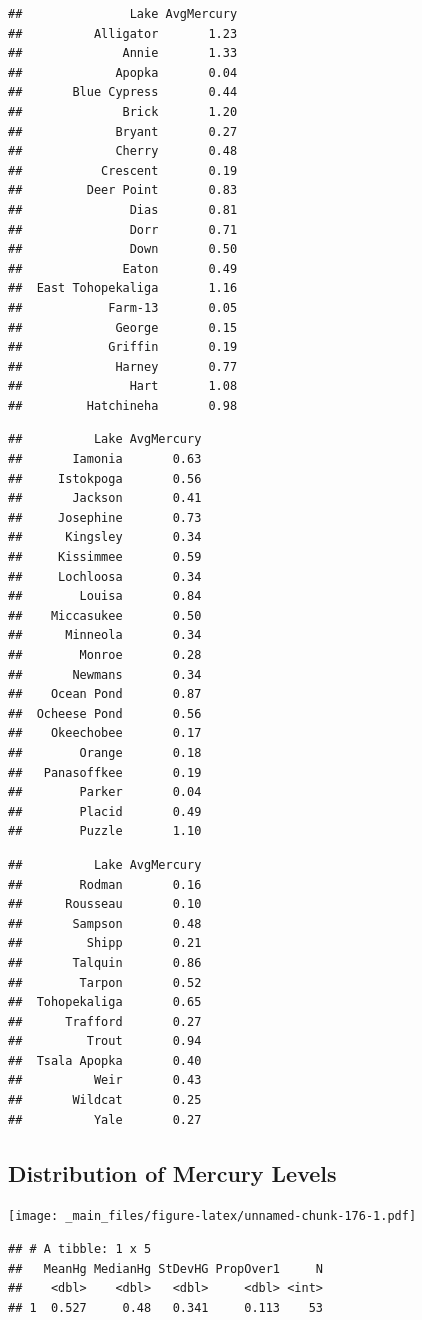 \documentclass[]{book}
\begin{document}
\begin{verbatim}
##               Lake AvgMercury
##          Alligator       1.23
##              Annie       1.33
##             Apopka       0.04
##       Blue Cypress       0.44
##              Brick       1.20
##             Bryant       0.27
##             Cherry       0.48
##           Crescent       0.19
##         Deer Point       0.83
##               Dias       0.81
##               Dorr       0.71
##               Down       0.50
##              Eaton       0.49
##  East Tohopekaliga       1.16
##            Farm-13       0.05
##             George       0.15
##            Griffin       0.19
##             Harney       0.77
##               Hart       1.08
##         Hatchineha       0.98
\end{verbatim}

\begin{verbatim}
##          Lake AvgMercury
##       Iamonia       0.63
##     Istokpoga       0.56
##       Jackson       0.41
##     Josephine       0.73
##      Kingsley       0.34
##     Kissimmee       0.59
##     Lochloosa       0.34
##        Louisa       0.84
##    Miccasukee       0.50
##      Minneola       0.34
##        Monroe       0.28
##       Newmans       0.34
##    Ocean Pond       0.87
##  Ocheese Pond       0.56
##    Okeechobee       0.17
##        Orange       0.18
##   Panasoffkee       0.19
##        Parker       0.04
##        Placid       0.49
##        Puzzle       1.10
\end{verbatim}

\begin{verbatim}
##          Lake AvgMercury
##        Rodman       0.16
##      Rousseau       0.10
##       Sampson       0.48
##         Shipp       0.21
##       Talquin       0.86
##        Tarpon       0.52
##  Tohopekaliga       0.65
##      Trafford       0.27
##         Trout       0.94
##  Tsala Apopka       0.40
##          Weir       0.43
##       Wildcat       0.25
##          Yale       0.27
\end{verbatim}

\subsection{Distribution of Mercury
Levels}\label{distribution-of-mercury-levels}

\texttt{[image: \_main\_files/figure-latex/unnamed-chunk-176-1.pdf]}

\begin{verbatim}
## # A tibble: 1 x 5
##   MeanHg MedianHg StDevHG PropOver1     N
##    <dbl>    <dbl>   <dbl>     <dbl> <int>
## 1  0.527     0.48   0.341     0.113    53
\end{verbatim}
\end{document}
